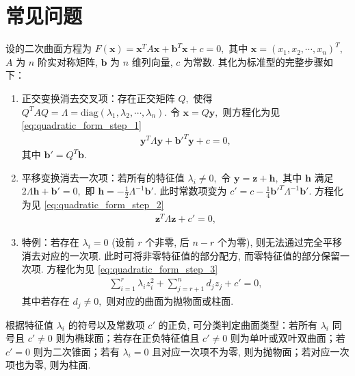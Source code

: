 \documentclass[../../main.tex]{subfiles}%
\begin{document}
\section{常见问题}

\begin{example}
设的二次曲面方程为 $F(\bm{x}) = \bm{x}^T A \bm{x} + \bm{b}^T \bm{x} + c = 0,$ 其中 $\bm{x} = (x_1, x_2, \cdots, x_n)^T,$ $A$ 为 $n$ 阶实对称矩阵, $\bm{b}$ 为 $n$ 维列向量, $c$ 为常数. 其化为标准型的完整步骤如下：
\begin{enumerate}[(1)]
\item 正交变换消去交叉项：存在正交矩阵 $Q,$ 使得 $Q^T A Q = \Lambda = \mathrm{diag}(\lambda_1, \lambda_2, \cdots, \lambda_n).$ 令 $\bm{x} = Q \bm{y},$ 则方程化为见 \eqref{eq:quadratic_form_step_1}
\begin{align}
\bm{y}^T \Lambda \bm{y} + \bm{b}'^T \bm{y} + c = 0, \label{eq:quadratic_form_step_1}
\end{align}
其中 $\bm{b}' = Q^T \bm{b}.$
\item 平移变换消去一次项：若所有的特征值 $\lambda_i \neq 0,$ 令 $\bm{y} = \bm{z} + \bm{h},$ 其中 $\bm{h}$ 满足 $2 \Lambda \bm{h} + \bm{b}' = 0,$ 即 $\bm{h} = -\frac{1}{2} \Lambda^{-1} \bm{b}'.$ 此时常数项变为 $c' = c - \frac{1}{4} \bm{b}'^T \Lambda^{-1} \bm{b}'.$ 方程化为见 \eqref{eq:quadratic_form_step_2}
\begin{align}
\bm{z}^T \Lambda \bm{z} + c' = 0, \label{eq:quadratic_form_step_2}
\end{align}
\item 特例：若存在 $\lambda_i = 0$ (设前 $r$ 个非零, 后 $n-r$ 个为零), 则无法通过完全平移消去对应的一次项. 此时可将非零特征值的部分配方, 而零特征值的部分保留一次项. 方程化为见 \eqref{eq:quadratic_form_step_3}
\begin{align}
\sum_{i=1}^{r} \lambda_i z_i^2 + \sum_{j=r+1}^{n} d_j z_j + c' = 0, \label{eq:quadratic_form_step_3}
\end{align}
其中若存在 $d_j \neq 0,$ 则对应的曲面为抛物面或柱面.
\end{enumerate}
根据特征值 $\lambda_i$ 的符号以及常数项 $c'$ 的正负, 可分类判定曲面类型：若所有 $\lambda_i$ 同号且 $c' \neq 0$ 则为椭球面；若存在正负特征值且 $c' \neq 0$ 则为单叶或双叶双曲面；若 $c' = 0$ 则为二次锥面；若有 $\lambda_i = 0$ 且对应一次项不为零, 则为抛物面；若对应一次项也为零, 则为柱面.
\end{example}
\end{document}
